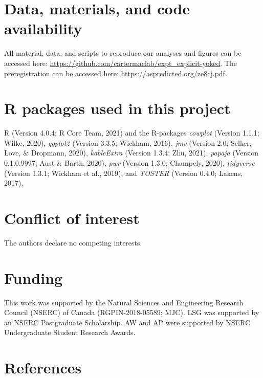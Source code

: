 \documentclass[
  english,
  man, donotrepeattitle,floatsintext]{apa7}
\begin{document}
\hypertarget{data-materials-and-code-availability}{%
\section{Data, materials, and code availability}\label{data-materials-and-code-availability}}

\label{sec:sharing}
All material, data, and scripts to reproduce our analyses and figures can be accessed here: \url{https://github.com/cartermaclab/expt_explicit-yoked}. The preregistration can be accessed here: \url{https://aspredicted.org/ze8cj.pdf}.

\hypertarget{r-packages-used-in-this-project}{%
\section{R packages used in this project}\label{r-packages-used-in-this-project}}

R (Version 4.0.4; R Core Team, 2021) and the R-packages \emph{cowplot} (Version 1.1.1; Wilke, 2020), \emph{ggplot2} (Version 3.3.5; Wickham, 2016), \emph{jmv} (Version 2.0; Selker, Love, \& Dropmann, 2020), \emph{kableExtra} (Version 1.3.4; Zhu, 2021), \emph{papaja} (Version 0.1.0.9997; Aust \& Barth, 2020), \emph{pwr} (Version 1.3.0; Champely, 2020), \emph{tidyverse} (Version 1.3.1; Wickham et al., 2019), and \emph{TOSTER} (Version 0.4.0; Lakens, 2017).

\hypertarget{conflict-of-interest}{%
\section{Conflict of interest}\label{conflict-of-interest}}

The authors declare no competing interests.

\hypertarget{funding}{%
\section{Funding}\label{funding}}

This work was supported by the Natural Sciences and Engineering Research Council (NSERC) of Canada (RGPIN-2018-05589; MJC). LSG was supported by an NSERC Postgraduate Scholarship. AW and AP were supported by NSERC Undergraduate Student Research Awards.

\hypertarget{references}{%
\section{References}\label{references}}
\end{document}
